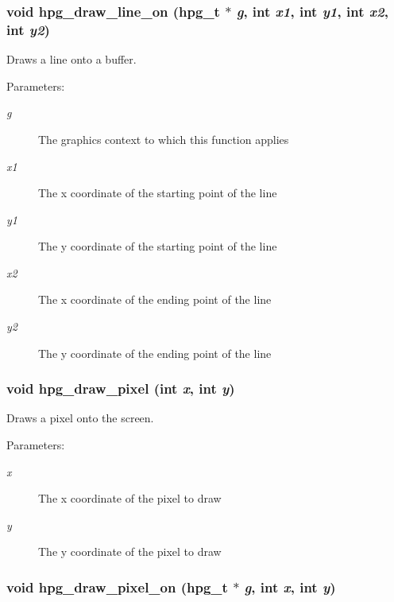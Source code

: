 \subsubsection{\setlength{\rightskip}{0pt plus 5cm}void hpg\_\-draw\_\-line\_\-on ({\bf hpg\_\-t} $\ast$ {\em g}, int {\em x1}, int {\em y1}, int {\em x2}, int {\em y2})}\label{hpgraphics_8h_a42}


Draws a line onto a buffer.

\begin{Desc}
\item[Parameters: ]\par
\begin{description}
\item[{\em 
g}]The graphics context to which this function applies \item[{\em 
x1}]The x coordinate of the starting point of the line \item[{\em 
y1}]The y coordinate of the starting point of the line \item[{\em 
x2}]The x coordinate of the ending point of the line \item[{\em 
y2}]The y coordinate of the ending point of the line \end{description}
\end{Desc}
\subsubsection{\setlength{\rightskip}{0pt plus 5cm}void hpg\_\-draw\_\-pixel (int {\em x}, int {\em y})}\label{hpgraphics_8h_a41}


Draws a pixel onto the screen.

\begin{Desc}
\item[Parameters: ]\par
\begin{description}
\item[{\em 
x}]The x coordinate of the pixel to draw \item[{\em 
y}]The y coordinate of the pixel to draw \end{description}
\end{Desc}
\subsubsection{\setlength{\rightskip}{0pt plus 5cm}void hpg\_\-draw\_\-pixel\_\-on ({\bf hpg\_\-t} $\ast$ {\em g}, int {\em x}, int {\em y})}\label{hpgraphics_8h_a40}


